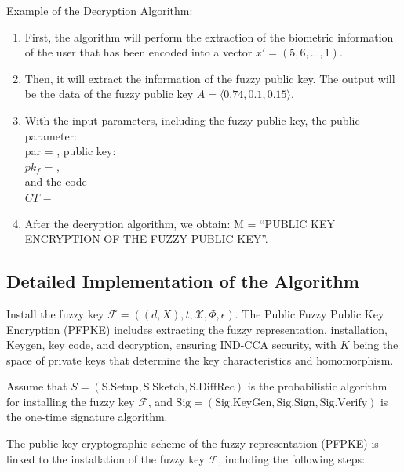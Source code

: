 \documentclass[graybox]{svmult}
\begin{document}
Example of the Decryption Algorithm:
\begin{enumerate}
    \item First, the algorithm will perform the extraction of the biometric information of the user that has been encoded into a vector $x' = (5, 6, \dots, 1)$.
    \item Then, it will extract the information of the fuzzy public key. The output will be the data of the fuzzy public key $A = \langle 0.74, 0.1, 0.15 \rangle$.
    \item With the input parameters, including the fuzzy public key, the public parameter:
        \\par = ,
        public key:
       \\ $pk_f$ = ,
      \\ and the code\\ $CT$ = 
    \item After the decryption algorithm, we obtain:
        M = ``PUBLIC KEY ENCRYPTION OF THE FUZZY PUBLIC KEY''.
\end{enumerate}

\subsection{Detailed Implementation of the Algorithm}
Install the fuzzy key $\mathcal{F} = ((d, X), t, \mathcal{X}, \Phi, \epsilon)$. The Public Fuzzy Public Key Encryption (PFPKE) includes extracting the fuzzy representation, installation, Keygen, key code, and decryption, ensuring IND-CCA security, with $K$ being the space of private keys that determine the key characteristics and homomorphism.

Assume that $S = (\text{S.Setup}, \text{S.Sketch}, \text{S.DiffRec})$ is the probabilistic algorithm for installing the fuzzy key $\mathcal{F}$, and $\text{Sig} = (\text{Sig.KeyGen}, \text{Sig.Sign}, \text{Sig.Verify})$ is the one-time signature algorithm.

The public-key cryptographic scheme of the fuzzy representation (PFPKE) is linked to the installation of the fuzzy key $\mathcal{F}$, including the following steps:
\end{document}
